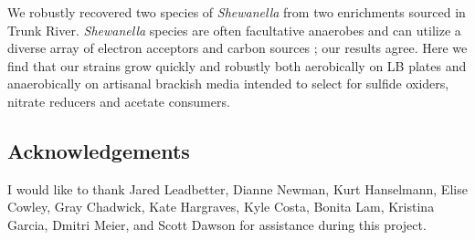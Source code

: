 \documentclass{article}
\begin{document}
We robustly recovered two species of {\em Shewanella} from two
enrichments sourced in Trunk River.  {\em Shewanella} species are
often facultative anaerobes and can utilize a diverse array of
electron acceptors and carbon sources
\cite{venkateswaran1999polyphasic}; our results agree.  Here we find
that our strains grow quickly and robustly both aerobically on LB
plates and anaerobically on artisanal brackish media intended to
select for sulfide oxiders, nitrate reducers and acetate consumers.

\subsection*{Acknowledgements}

I would like to thank Jared Leadbetter, Dianne Newman, Kurt Hanselmann,
Elise Cowley, Gray Chadwick, Kate Hargraves, Kyle Costa, Bonita Lam,
Kristina Garcia, Dmitri Meier, and Scott Dawson for assistance during
this project.



\end{document}
